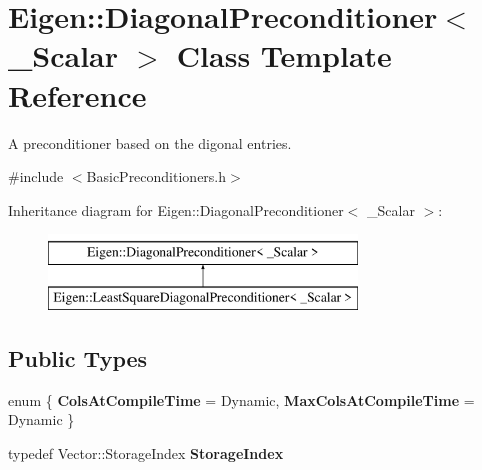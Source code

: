 \hypertarget{class_eigen_1_1_diagonal_preconditioner}{}\section{Eigen\+::Diagonal\+Preconditioner$<$ \+\_\+\+Scalar $>$ Class Template Reference}
\label{class_eigen_1_1_diagonal_preconditioner}


A preconditioner based on the digonal entries.  




{\ttfamily \#include $<$Basic\+Preconditioners.\+h$>$}

Inheritance diagram for Eigen\+::Diagonal\+Preconditioner$<$ \+\_\+\+Scalar $>$\+:\begin{figure}[H]
\begin{center}
\leavevmode
\includegraphics[height=2.000000cm]{class_eigen_1_1_diagonal_preconditioner}
\end{center}
\end{figure}
\subsection*{Public Types}
\begin{DoxyCompactItemize}
\item 
\mbox{\label{class_eigen_1_1_diagonal_preconditioner_ab79847e20849924c84fe325d1d65c870}} 
enum \{ {\bfseries Cols\+At\+Compile\+Time} = Dynamic, 
{\bfseries Max\+Cols\+At\+Compile\+Time} = Dynamic
 \}
\item 
\mbox{\label{class_eigen_1_1_diagonal_preconditioner_a21a4ddda2e64177b5afc4c7c45a6ced9}} 
typedef Vector\+::\+Storage\+Index {\bfseries Storage\+Index}
\end{DoxyCompactItemize}
